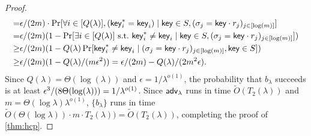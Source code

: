 \begin{proof}
\[\begin{split}
		=& \polysmall/(2m) \cdot \Pr[\forall i \in [Q(\lambda)], (\tempkey^*_i = \tempkey_i) \mid \tempkey \in S, (\sigma_j = \tempkey \cdot r_j)_{j \in [\log (m)]}] \\
		=& \polysmall/(2m)(1-\Pr[\exists i \in [Q(\lambda)]\ \mbox{s.t.}\ \tempkey^*_i \neq \tempkey_i \mid \tempkey \in S, (\sigma_j = \tempkey \cdot r_j)_{j \in [\log (m)]}])\\
		\geq& \polysmall/(2m)(1-Q(\lambda)\Pr[\tempkey^*_i \neq \tempkey_i \mid (\sigma_j = \tempkey \cdot r_j)_{j \in [\log (m)]}, \tempkey \in S])\\
		\geq& \polysmall/(2m)(1-Q(\lambda)/(m\polysmall^2)) = \polysmall/(2m) - Q(\lambda)/(2m^2\polysmall).
	\end{split}\]
	Since $Q(\lambda) = \Theta(\log(\lambda))$ and $\epsilon = 1/\lambda^{o(1)}$, the probability that $b_{\lambda}$ succeeds is at least $\epsilon^3/(8\Theta(\log(\lambda))) = 1/\lambda^{o(1)}$.
	Since ${\mathsf{adv}}_\lambda$ runs in time $\tilde{O}(T_2(\lambda))$ and $m = \Theta(\log \lambda) \lambda^{o(1)}$, $\{b_{\lambda}\}$ runs in time $\tilde{O}(\Theta(\log \lambda))\cdot m \cdot T_2(\lambda))=\tilde{O}(T_2(\lambda))$, completing the proof of \cref{thm:hcp}.
\end{proof}


